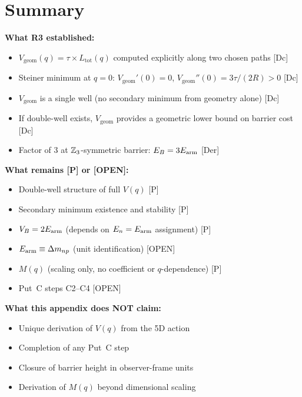 \section{Summary}
\label{sec:vq:summary}

\begin{resultbox}[title=R3 Partial Closure Summary]
    \textbf{What R3 established:}
    \begin{itemize}
        \item $V_{\mathrm{geom}}(q) = \tau \times L_{\mathrm{tot}}(q)$
              computed explicitly along two chosen paths \hfill [Dc]
        \item Steiner minimum at $q = 0$: $V_{\mathrm{geom}}'(0) = 0$,
              $V_{\mathrm{geom}}''(0) = 3\tau/(2R) > 0$ \hfill [Dc]
        \item $V_{\mathrm{geom}}$ is a single well
              (no secondary minimum from geometry alone) \hfill [Dc]
        \item If double-well exists, $V_{\mathrm{geom}}$ provides a
              geometric lower bound on barrier cost \hfill [Dc]
        \item Factor of 3 at $\mathbb{Z}_3$-symmetric barrier:
              $E_B = 3E_{\text{arm}}$ \hfill [Der]
    \end{itemize}

    \textbf{What remains [P] or [OPEN]:}
    \begin{itemize}
        \item Double-well structure of full $V(q)$ \hfill [P]
        \item Secondary minimum existence and stability \hfill [P]
        \item $V_B = 2E_{\text{arm}}$ (depends on $E_n = E_{\text{arm}}$ assignment) \hfill [P]
        \item $E_{\text{arm}} \equiv \Delta m_{np}$ (unit identification) \hfill [OPEN]
        \item $M(q)$ (scaling only, no coefficient or $q$-dependence) \hfill [P]
        \item Put~C steps C2--C4 \hfill [OPEN]
    \end{itemize}

    \textbf{What this appendix does NOT claim:}
    \begin{itemize}
        \item Unique derivation of $V(q)$ from the 5D action
        \item Completion of any Put~C step
        \item Closure of barrier height in observer-frame units
        \item Derivation of $M(q)$ beyond dimensional scaling
    \end{itemize}
\end{resultbox}

